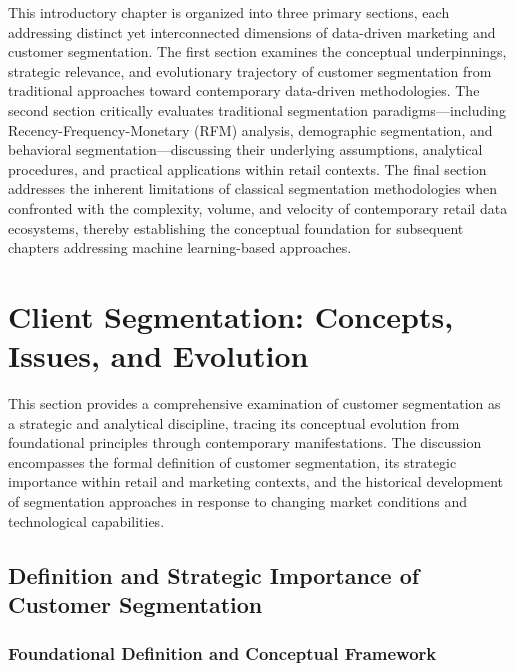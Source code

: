 \documentclass[12pt,a4paper,oneside]{report}
\begin{document}
This introductory chapter is organized into three primary sections, each addressing distinct yet interconnected dimensions of data-driven marketing and customer segmentation. The first section examines the conceptual underpinnings, strategic relevance, and evolutionary trajectory of customer segmentation from traditional approaches toward contemporary data-driven methodologies. The second section critically evaluates traditional segmentation paradigms—including Recency-Frequency-Monetary (RFM) analysis, demographic segmentation, and behavioral segmentation—discussing their underlying assumptions, analytical procedures, and practical applications within retail contexts. The final section addresses the inherent limitations of classical segmentation methodologies when confronted with the complexity, volume, and velocity of contemporary retail data ecosystems, thereby establishing the conceptual foundation for subsequent chapters addressing machine learning-based approaches.


\section{Client Segmentation: Concepts, Issues, and Evolution}

This section provides a comprehensive examination of customer segmentation as a strategic and analytical discipline, tracing its conceptual evolution from foundational principles through contemporary manifestations. The discussion encompasses the formal definition of customer segmentation, its strategic importance within retail and marketing contexts, and the historical development of segmentation approaches in response to changing market conditions and technological capabilities.


\subsection{Definition and Strategic Importance of Customer Segmentation}

\subsubsection{Foundational Definition and Conceptual Framework}
\end{document}
